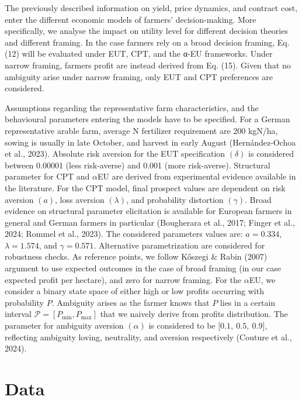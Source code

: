 \documentclass[
]{article}
\begin{document}
The previously described information on yield, price dynamics, and
contract cost, enter the different economic models of farmers'
decision-making. More specifically, we analyse the impact on utility
level for different decision theories and different framing. In the case
farmers rely on a broad decision framing, Eq. (12) will be evaluated
under EUT, CPT, and the α-EU frameworks. Under narrow framing, farmers
profit are instead derived from Eq. (15). Given that no ambiguity arise
under narrow framing, only EUT and CPT preferences are considered.

Assumptions regarding the representative farm characteristics, and the
behavioural parameters entering the models have to be specified. For a
German representative arable farm, average N fertilizer requirement are
200 kgN/ha, sowing is usually in late October, and harvest in early
August (Hernández-Ochoa et al., 2023). Absolute risk aversion for the
EUT specification \((\delta)\) is considered between 0.00001 (less
risk-averse) and 0.001 (more risk-averse). Structural parameter for CPT
and \(\alpha\)EU are derived from experimental evidence available in the
literature. For the CPT model, final prospect values are dependent on
risk aversion \((a)\), loss aversion \((\lambda)\), and probability
distortion \((\gamma)\). Broad evidence on structural parameter
elicitation is available for European farmers in general and German
farmers in particular (Bougherara et al., 2017; Finger et al., 2024;
Rommel et al., 2023). The considered parameters values are:
\(a = 0.334\), \(\lambda = 1.574\), and \(\gamma = 0.571\). Alternative
parametrization are considered for robustness checks. As reference
points, we follow Kőszegi \& Rabin (2007) argument to use expected
outcomes in the case of broad framing (in our case expected profit per
hectare), and zero for narrow framing. For the \(\alpha\)EU, we consider
a binary state space of either high or low profits occurring with
probability \(P\). Ambiguity arises as the farmer knows that \(P\) lies
in a certain interval
\(\mathcal{P =}\left\lbrack P_{\min},P_{\max} \right\rbrack\) that we
naively derive from profits distribution. The parameter for ambiguity
aversion \((\alpha)\) is considered to be
\(\lbrack 0.1,\ 0.5,\ 0.9\rbrack\), reflecting ambiguity loving,
neutrality, and aversion respectively (Couture et al., 2024).

\section{Data}\label{data}
\end{document}
